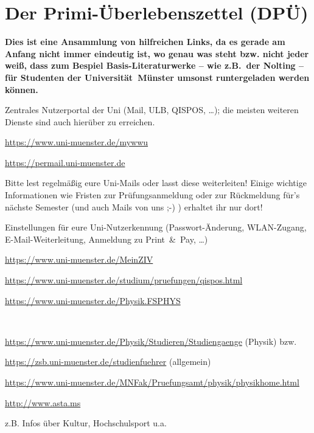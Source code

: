 \section[Primi-Überlebenszettel (DPÜ, wichtige Links)]{Der Primi-Überlebenszettel (DPÜ)\label{dpü}}
\vspace{-0.5cm}\textbf{Dies ist eine Ansammlung von hilfreichen Links, da es gerade am Anfang nicht immer eindeutig ist, wo genau was steht bzw. nicht jeder weiß, dass zum Bespiel Basis-Literaturwerke -- wie z.B.\ der Nolting -- für Studenten der Universität~Münster umsonst runtergeladen werden können.}
\vspace{-0.2cm}
\begin{description}[itemsep=0.5cm]
\setlength{\parskip}{0cm}
\centering
\item[Uni -- myWWU-Portal:] Zentrales Nutzerportal der Uni (Mail, ULB, QISPOS, \dots); die meisten weiteren Dienste sind auch hierüber zu erreichen.

\url{https://www.uni-muenster.de/mywwu}
\item[Uni -- Mailsystem (perMail):] \url{https://permail.uni-muenster.de}

Bitte lest regelmäßig eure Uni-Mails oder lasst diese weiterleiten! Einige wichtige Informationen wie Fristen zur Prüfungsanmeldung oder zur Rückmeldung für's nächste Semester (und auch Mails von uns ;-) ) erhaltet ihr nur dort!
\item[Uni -- MeinZIV:] Einstellungen für eure Uni-Nutzerkennung (Passwort-Änderung, WLAN-Zugang, E-Mail-Weiterleitung, Anmeldung zu Print~\&~Pay, \dots)

\url{https://www.uni-muenster.de/MeinZIV}
\item[QISPOS:] \url{https://www.uni-muenster.de/studium/pruefungen/qispos.html}
\item[Fachschaft Physik:] \url{https://www.uni-muenster.de/Physik.FSPHYS}
\item[Studienordnungen/-infos:]~

\url{https://www.uni-muenster.de/Physik/Studieren/Studiengaenge} (Physik) bzw.

\url{https://zsb.uni-muenster.de/studienfuehrer} (allgemein)
\item[Prüfungsamt Physik:] \url{https://www.uni-muenster.de/MNFak/Pruefungsamt/physik/physikhome.html}
\item[AStA Uni Münster:] \url{http://www.asta.ms}
\item[(Über-)Leben in Münster:] z.B. Infos über Kultur, Hochschulsport u.a.


\end{description}
